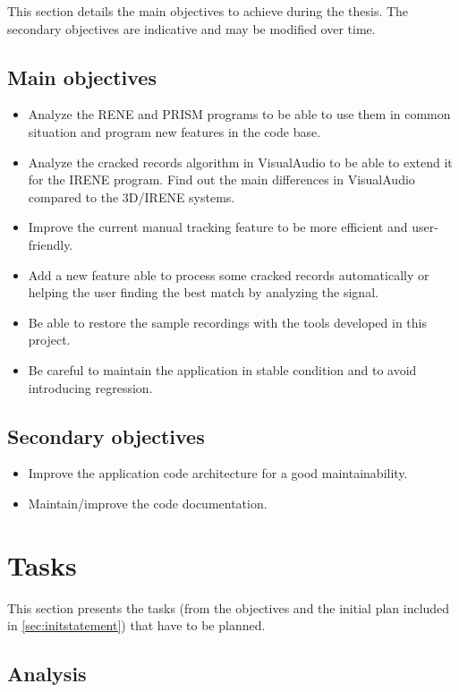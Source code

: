 This section details the main objectives to achieve during the thesis. The secondary objectives are indicative and may be modified over time.

\subsection{Main objectives}
\label{sec:mainobjectives}

\begin{itemize}
    \item Analyze the RENE and PRISM programs to be able to use them in common situation and program new features in the code base.
    \item Analyze the cracked records algorithm in VisualAudio to be able to extend it for the IRENE program. Find out the main differences in VisualAudio compared to the 3D/IRENE systems.
    \item Improve the current manual tracking feature to be more efficient and user-friendly.
    \item Add a new feature able to process some cracked records automatically or helping the user finding the best match by analyzing the signal.
    \item Be able to restore the sample recordings with the tools developed in this project.
    \item Be careful to maintain the application in stable condition and to avoid introducing regression.
\end{itemize}

\subsection{Secondary objectives}

\begin{itemize}
    \item Improve the application code architecture for a good maintainability.
    \item Maintain/improve the code documentation.
\end{itemize}

\section{Tasks}

This section presents the tasks (from the objectives and the initial plan included in \autoref{sec:initstatement}) that have to be planned.

\subsection{Analysis}

